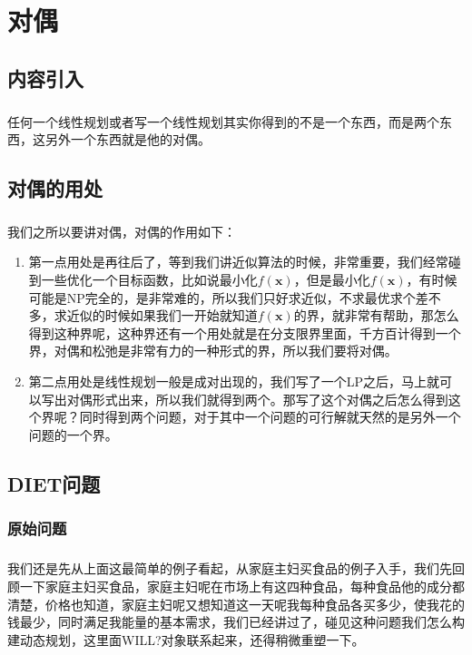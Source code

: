 \chapter{对偶}



    \section{内容引入}
        \paragraph{}任何一个线性规划或者写一个线性规划其实你得到的不是一个东西，而是两个东西，这另外一个东西就是他的对偶。 
    \section{对偶的用处}
        \paragraph{}我们之所以要讲对偶，对偶的作用如下：
        \begin{enumerate}
        \item 第一点用处是再往后了，等到我们讲近似算法的时候，非常重要，我们经常碰到一些优化一个目标函数，比如说最小化$f(\bm{x})$，但是最小化$f(\bm{x})$，有时候可能是NP完全的，是非常难的，所以我们只好求近似，不求最优求个差不多，求近似的时候如果我们一开始就知道$f(\bm{x})$的界，就非常有帮助，那怎么得到这种界呢，这种界还有一个用处就是在分支限界里面，千方百计得到一个界，对偶和松弛是非常有力的一种形式的界，所以我们要将对偶。
        \item 第二点用处是线性规划一般是成对出现的，我们写了一个LP之后，马上就可以写出对偶形式出来，所以我们就得到两个。那写了这个对偶之后怎么得到这个界呢？同时得到两个问题，对于其中一个问题的可行解就天然的是另外一个问题的一个界。
        \end{enumerate}
       
    \section{DIET问题}
    
    \subsection{原始问题}
    	\paragraph{}我们还是先从上面这最简单的例子看起，从家庭主妇买食品的例子入手，我们先回顾一下家庭主妇买食品，家庭主妇呢在市场上有这四种食品，每种食品他的成分都清楚，价格也知道，家庭主妇呢又想知道这一天呢我每种食品各买多少，使我花的钱最少，同时满足我能量的基本需求，我们已经讲过了，碰见这种问题我们怎么构建动态规划，这里面WILL?对象联系起来，还得稍微重塑一下。
